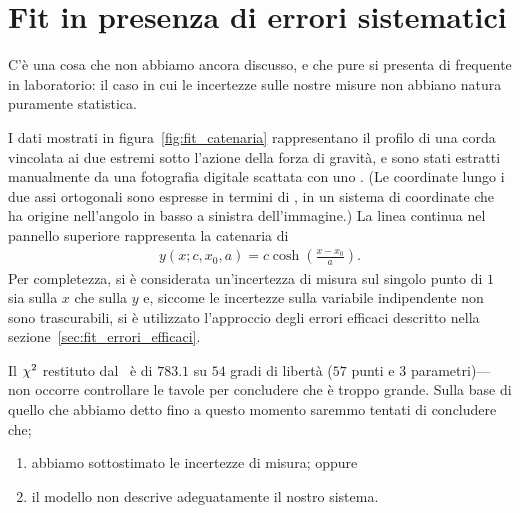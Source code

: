 \section{Fit in presenza di errori sistematici}

C'è una cosa che non abbiamo ancora discusso, e che pure si presenta di frequente
in laboratorio: il caso in cui le incertezze sulle nostre misure non abbiano
natura puramente statistica.

I dati mostrati in figura~\ref{fig:fit_catenaria} rappresentano il profilo di una
corda vincolata ai due estremi sotto l'azione della forza di gravità, e sono
stati estratti manualmente da una fotografia digitale scattata con uno
. (Le coordinate lungo i due assi ortogonali sono espresse
in termini di , in un sistema di coordinate che ha origine nell'angolo
in basso a sinistra dell'immagine.) La linea continua nel pannello superiore
rappresenta la catenaria di \bestfit
\begin{align*}
  y(x; c, x_0, a) = c \cosh\left( \frac{x - x_0}{a} \right).
\end{align*}
Per completezza, si è considerata un'incertezza di misura sul singolo punto di
$1$~ sia sulla $x$ che sulla $y$ e, siccome le incertezze sulla
variabile indipendente non sono trascurabili, si è utilizzato l'approccio degli
errori efficaci descritto nella sezione~\ref{sec:fit_errori_efficaci}.


Il $\chi^2$ restituto dal \fit\ è di $783.1$ su $54$ gradi di libertà
($57$ punti e $3$ parametri)---non occorre controllare le tavole per concludere
che è troppo grande. Sulla base di quello che abbiamo detto fino a questo momento
saremmo tentati di concludere che;
\begin{enumerate}
  \item abbiamo sottostimato le incertezze di misura; oppure
  \item il modello non descrive adeguatamente il nostro sistema.
\end{enumerate}

